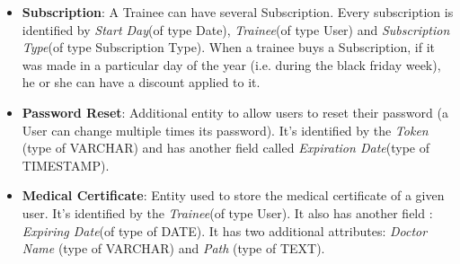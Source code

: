 \begin{itemize}
    	\item \textbf{Subscription}: A Trainee can have several Subscription. Every subscription is identified by \textit{Start Day}(of type Date), \textit{Trainee}(of type User) and \textit{Subscription Type}(of type Subscription Type). When a trainee buys a Subscription, if it was made in a particular day of the year (i.e. during the black friday week), he or she can have a discount applied to it.
    	
    	\item \textbf{Password Reset}: Additional entity to allow users to reset their password (a User can change multiple times its password). It's identified by the \textit{Token} (type of VARCHAR) and has another field called \textit{Expiration Date}(type of TIMESTAMP).
        
        \item \textbf{Medical Certificate}: Entity used to store the medical certificate of a given user. It's identified by the \textit{Trainee}(of type User). It also has another field : \textit{Expiring Date}(of type of DATE). It has two additional attributes: \textit{Doctor Name} (type of VARCHAR) and \textit{Path} (type of TEXT).
	
    \end{itemize}